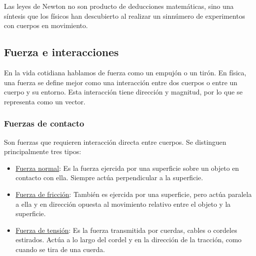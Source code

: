 \documentclass{article}
\newcommand{\newsubsection}[1]{
    \vspace{0.5cm}
    \color{sectionColor}
    \subsection{\bl{#1}}
    \color{black}
    \vspace{0.5cm}
}
\newcommand{\newtitle}[1]{
    \color{titleColor}
    \subsubsection{#1}
    \color{black}
}
\newcommand{\bl}[1]{\textbf{#1}}
\begin{document}
\par Las leyes de Newton no son producto de deducciones matemáticas, sino una síntesis que los físicos han descubierto al realizar un sinnúmero de experimentos con cuerpos en movimiento.


    \newsubsection{Fuerza e interacciones}

        \par En la vida cotidiana hablamos de fuerza como un empujón o un tirón. En física, una fuerza se define mejor como una interacción entre dos cuerpos o entre un cuerpo y su entorno. Esta interacción tiene dirección y magnitud, por lo que se representa como un vector.

    \newtitle{Fuerzas de contacto}

        \par Son fuerzas que requieren interacción directa entre cuerpos. Se distinguen principalmente tres tipos:

        \begin{itemize}
            \item \underline{Fuerza normal}: Es la fuerza ejercida por una superficie sobre un objeto en contacto con ella. Siempre actúa perpendicular a la superficie.
            \item \underline{Fuerza de fricción}: También es ejercida por una superficie, pero actúa paralela a ella y en dirección opuesta al movimiento relativo entre el objeto y la superficie.
            \item \underline{Fuerza de tensión}: Es la fuerza transmitida por cuerdas, cables o cordeles estirados. Actúa a lo largo del cordel y en la dirección de la tracción, como cuando se tira de una cuerda.
        \end{itemize}
\end{document}
